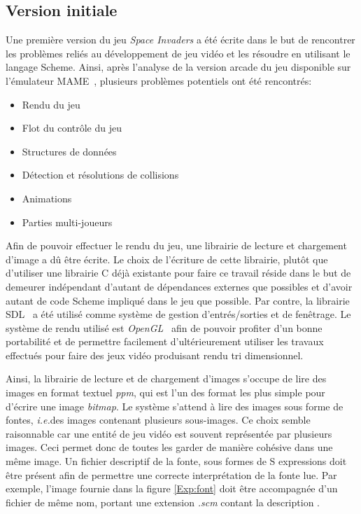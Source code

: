 \documentclass[12pt,oneside,letterpaper,francais]{book}
\newcommand{\ie}{{\textit{i.e.}}}
\newcommand{\si}{{\textit{Space Invaders }}}
\newcommand{\scheme}[1]{\selectlanguage{english}{\tt #1}\selectlanguage{french}}
\begin{document}
\subsection{Version initiale}
\label{Exp:sp1}

Une première version du jeu \si a été écrite dans le but de rencontrer
les problèmes reliés au développement de jeu vidéo et les résoudre en
utilisant le langage Scheme. Ainsi, après l'analyse de la version
arcade du jeu disponible sur l'émulateur MAME~\cite{MAME}, plusieurs
problèmes potentiels ont été rencontrés:

\begin{itemize}
\item Rendu du jeu
\item Flot du contrôle du jeu
\item Structures de données
\item Détection et résolutions de collisions
\item Animations
\item Parties multi-joueurs
\end{itemize}

Afin de pouvoir effectuer le rendu du jeu, une librairie de lecture et
chargement d'image a dû être écrite. Le choix de l'écriture de cette
librairie, plutôt que d'utiliser une librairie C déjà existante pour
faire ce travail réside dans le but de demeurer indépendant d'autant
de dépendances externes que possibles et d'avoir autant de code Scheme
impliqué dans le jeu que possible. Par contre, la librairie
SDL~\cite{SDL} a été utilisé comme système de gestion d'entrés/sorties
et de fenêtrage. Le système de rendu utilisé est
\textit{OpenGL}~\cite{OpenGL} afin de pouvoir profiter d'un bonne
portabilité et de permettre facilement d'ultérieurement utiliser les
travaux effectués pour faire des jeux vidéo produisant rendu tri
dimensionnel.

Ainsi, la librairie de lecture et de chargement d'images s'occupe de
lire des images en format textuel \textit{ppm}, qui est l'un des
format les plus simple pour d'écrire une image \textit{bitmap}. Le
système s'attend à lire des images sous forme de fontes, \ie des
images contenant plusieurs sous-images. Ce choix semble raisonnable
car une entité de jeu vidéo est souvent représentée par plusieurs
images. Ceci permet donc de toutes les garder de manière cohésive dans
une même image. Un fichier descriptif de la fonte, sous formes de S
expressions doit être présent afin de permettre une correcte
interprétation de la fonte lue. Par exemple, l'image fournie dans la
figure \ref{Exp:font} doit être accompagnée d'un fichier de même nom,
portant une extension \emph{.scm} contant la description
\scheme{((colors: (white green red)) (chars: (0 1)))}.
\end{document}
